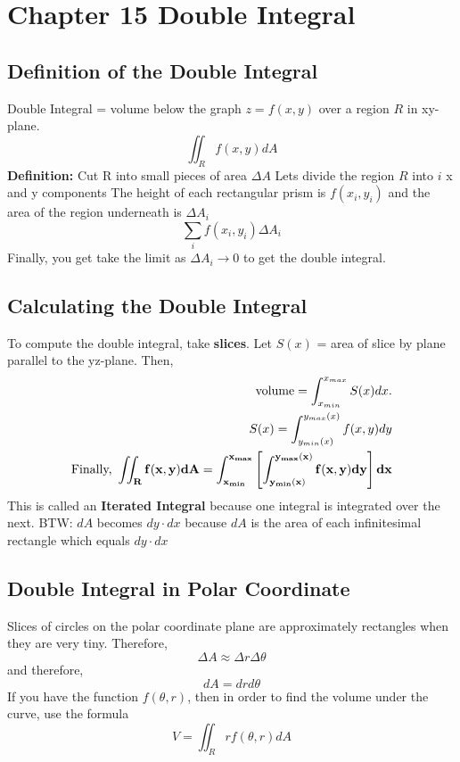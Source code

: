 \documentclass[../main.tex]{subfiles}
\begin{document}
\section{Chapter 15 Double Integral}

\subsection{Definition of the Double Integral}
Double Integral = volume below the graph $z = f(x,y)$ over a region $R$ in xy-plane.
\begin{equation*}
	\iint_R f(x,y)dA
\end{equation*}
\textbf{Definition: } Cut R into small pieces of area $\Delta A$
Lets divide the region $R$ into $i$ x and y components
The height of each rectangular prism is $f(x_i, y_i)$ and the area of the region underneath is $\Delta A_i$
\begin{equation*}
	\sum_i f(x_i,y_i) \Delta A_i 
\end{equation*}
Finally, you get take the limit as $\Delta A_i \to 0$ to get the double integral.

\subsection{Calculating the Double Integral}
To compute the double integral, take \textbf{slices}. 
Let $S(x)$ = area of slice by plane parallel to the yz-plane.
Then, 
\begin{align*}
	\text{volume} = \int_{x_{min}}^{x_{max}} S(x)dx. \\
	S(x) = \int_{y_{min}(x)}^{y_{max}(x)} f(x,y)dy \\
	{\bf \text{Finally, } \iint_R f(x,y) dA = \int_{x_{min}}^{x_{max}} \left[ \int_{y_{min}(x)}^{y_{max}(x)} f(x,y) dy \right] dx}
\end{align*}
This is called an \textbf{Iterated Integral} because one integral is integrated over the next.
BTW: $dA$ becomes $dy \cdot dx$ because $dA$ is the area of each infinitesimal rectangle which equals $dy \cdot dx$

\subsection{Double Integral in Polar Coordinate}
Slices of circles on the polar coordinate plane are approximately rectangles when they are very tiny. Therefore,
\begin{equation*}
	\Delta A \approx \Delta r \Delta \theta
\end{equation*}
and therefore, 
\begin{equation*}
	dA = dr d\theta
\end{equation*}
If you have the function $f(\theta,r)$, then in order to find the volume under the curve, use the formula
\begin{equation*}
	V = \iint_R rf(\theta,r) dA
\end{equation*}
\end{document}
